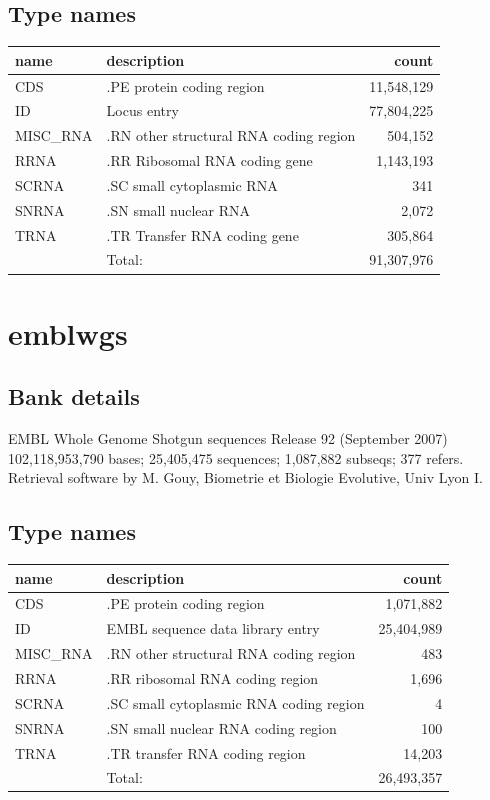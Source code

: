 \documentclass{article}
\begin{document}
\begin{Schunk}
\subsection{Type names}
\noindent\begin{tabular}{llr}
\hline \hline
name & description & count \\
\hline
CDS  &  .PE protein coding region  &  11,548,129 \\
ID  &  Locus entry  &  77,804,225 \\
MISC\_RNA  &  .RN other structural RNA coding region  &  504,152 \\
RRNA  &  .RR Ribosomal RNA coding gene  &  1,143,193 \\
SCRNA  &  .SC small cytoplasmic RNA  &  341 \\
SNRNA  &  .SN small nuclear RNA  &  2,072 \\
TRNA  &  .TR Transfer RNA coding gene  &  305,864 \\
\hline
 & Total: & 91,307,976 \\
\hline \hline
\end{tabular}

\section{ emblwgs }
\subsection{Bank details}
EMBL Whole Genome Shotgun sequences Release 92  (September 2007)\\
102,118,953,790 bases; 25,405,475 sequences; 1,087,882 subseqs; 377 refers.\\
Retrieval software by M. Gouy, Biometrie et Biologie Evolutive, Univ Lyon I.

\subsection{Type names}
\noindent\begin{tabular}{llr}
\hline \hline
name & description & count \\
\hline
CDS  &  .PE protein coding region  &  1,071,882 \\
ID  &  EMBL sequence data library entry  &  25,404,989 \\
MISC\_RNA  &  .RN other structural RNA coding region  &  483 \\
RRNA  &  .RR ribosomal RNA coding region  &  1,696 \\
SCRNA  &  .SC small cytoplasmic RNA coding region  &  4 \\
SNRNA  &  .SN small nuclear RNA coding region  &  100 \\
TRNA  &  .TR transfer RNA coding region  &  14,203 \\
\hline
 & Total: & 26,493,357 \\
\hline \hline
\end{tabular}


\end{Schunk}
\end{document}
